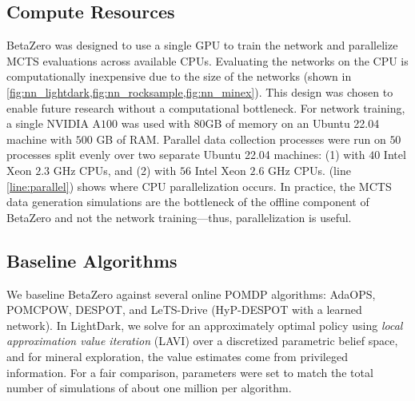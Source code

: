 \subsection{Compute Resources}

BetaZero was designed to use a single GPU to train the network and parallelize MCTS evaluations across available CPUs.
Evaluating the networks on the CPU is computationally inexpensive due to the size of the networks (shown in \cref{fig:nn_lightdark,fig:nn_rocksample,fig:nn_minex}).
This design was chosen to enable future research without a computational bottleneck.
For network training, a single NVIDIA A$100$ was used with $80$GB of memory on an Ubuntu 22.04 machine with $500$ GB of RAM.
Parallel data collection processes were run on $50$ processes split evenly over two separate Ubuntu 22.04 machines: (1) with $40$ Intel Xeon $2.3$ GHz CPUs, and (2) with $56$ Intel Xeon $2.6$ GHz CPUs.
 (line \ref*{line:parallel}) shows where CPU parallelization occurs.
In practice, the MCTS data generation simulations are the bottleneck of the offline component of BetaZero and not the network training---thus, parallelization is useful.


\subsection{Baseline Algorithms}\label{sec:betazero_baselines}
We baseline BetaZero against several online POMDP algorithms: AdaOPS, POMCPOW, DESPOT, and LeTS-Drive (HyP-DESPOT with a learned network).
In LightDark, we solve for an approximately optimal policy using \textit{local approximation value iteration} (LAVI) \cite{dmubook} over a discretized parametric belief space, and for mineral exploration, the value estimates come from privileged information.
For a fair comparison, parameters were set to match the total number of simulations of about one million per algorithm.


